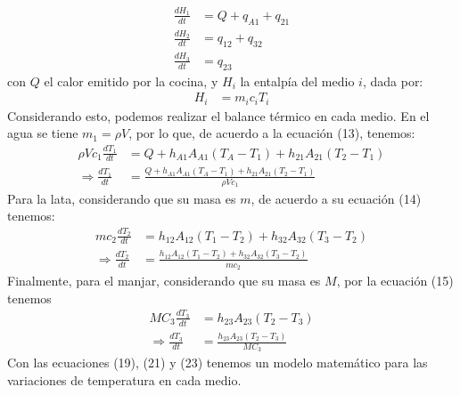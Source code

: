 \documentclass[
  11pt,
  letterpaper,
   addpoints,
   answers
  ]{exam}
\begin{document}
\begin{questions}
\begin{solution}
\begin{align}
    \frac{dH_1}{dt} &= Q + q_{A1} + q_{21} \tag{13} \\
    \frac{dH_2}{dt} &= q_{12} + q_{32} \tag{14} \\
    \frac{dH_3}{dt} &= q_{23} \tag{15}
    \end{align}    
con $Q$ el calor emitido por la cocina, y $H_i$ la entalpía del medio $i$, dada por:
\begin{align}
    H_i &= m_i c_i T_i \tag{17}
    \end{align}
Considerando esto, podemos realizar el balance térmico en cada medio. En el agua se tiene $m_1 = \rho V$, por lo que, de acuerdo a la ecuación (13), tenemos:
\begin{align}
    \rho V c_1 \frac{dT_1}{dt} &= Q + h_{A1}A_{A1} (T_A - T_1) + h_{21}A_{21} (T_2 - T_1) \tag{18} \\
    \Rightarrow \frac{dT_1}{dt} &= \frac{Q + h_{A1}A_{A1} (T_A - T_1) + h_{21}A_{21} (T_2 - T_1)}{\rho V c_1} \tag{19}
    \end{align}
Para la lata, considerando que su masa es $m$, de acuerdo a su ecuación (14) tenemos:
\begin{align}
    mc_2 \frac{dT_2}{dt} &= h_{12}A_{12} (T_1 - T_2) + h_{32}A_{32} (T_3 - T_2) \tag{20} \\
    \Rightarrow \frac{dT_2}{dt} &= \frac{h_{12}A_{12} (T_1 - T_2) + h_{32}A_{32} (T_3 - T_2)}{mc_2} \tag{21}
\end{align}
Finalmente, para el manjar, considerando que su masa es $M$, por la ecuación (15) tenemos
\begin{align}
    MC_3 \frac{dT_3}{dt} &= h_{23}A_{23} (T_2 - T_3) \tag{22} \\
    \Rightarrow \frac{dT_3}{dt} &= \frac{h_{23}A_{23} (T_2 - T_3)}{MC_3} \tag{23}
\end{align}
Con las ecuaciones (19), (21) y (23) tenemos un modelo matemático para las variaciones de temperatura en cada medio.

\end{solution}
\end{questions}
\end{document}
